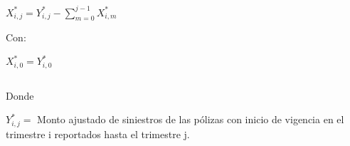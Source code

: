 \documentclass[11pt,twoside,openright,spanish]{report}
\numberwithin{equation}{chapter}
\numberwithin{figure}{chapter}
\numberwithin{table}{chapter}
\begin{document}
	\doublespacing

$ $

\doublespacing
	
		{\centering
		${X}_{i,j}^{*}={Y}_{i,j}^{*}-\sum _{m=0}^{j-1}{X}_{i,m}^{*}$
		\noindent
		
	}	
	\doublespacing
	
	Con:
	
	\doublespacing
		{\centering
	${X}_{i,0}^{*}={Y}_{i,0}^{*}$
	\noindent
	
}	


	\doublespacing

$ $

\doublespacing
	
	Donde
	
	\doublespacing
	
		${Y}_{i,j}^{*}=$ Monto ajustado de siniestros de las pólizas con inicio de vigencia en el trimestre i reportados hasta el trimestre j.
	
	\doublespacing

$ $

\doublespacing
	
\end{document}
